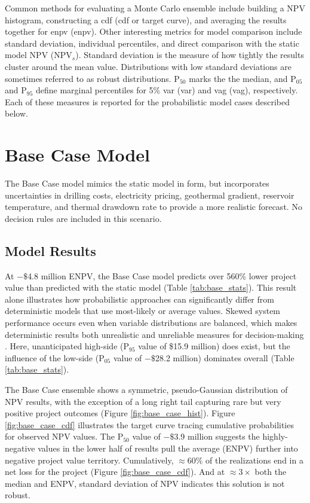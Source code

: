 Common methods for evaluating a Monte Carlo ensemble include building a NPV histogram, constructing a \acrlong{cdf} (\acrshort{cdf} or target curve), and averaging the results together for \acrlong{enpv} (\acrshort{enpv}). Other interesting metrics for model comparison include standard deviation, individual percentiles, and direct comparison with the static model NPV (NPV$_{s}$). Standard deviation is the measure of how tightly the results cluster around the mean value. Distributions with low standard deviations are sometimes referred to as robust distributions. P$_{50}$ marks the the median, and P$_{05}$ and P$_{95}$ define marginal percentiles for 5\% \acrlong{var} (\acrshort{var}) and \acrlong{vag} (\acrshort{vag}), respectively. Each of these measures is reported for the probabilistic model cases described below.

\section{Base Case Model}\label{ch6:base_case}

The Base Case model mimics the static model in form, but incorporates uncertainties in drilling costs, electricity pricing, geothermal gradient, reservoir temperature, and thermal drawdown rate to provide a more realistic forecast. No decision rules are included in this scenario. 

\subsection{Model Results}\label{ch6:base_results}

At $-\$$4.8 million ENPV, the Base Case model predicts over 560\% lower project value than predicted with the static model (Table \ref{tab:base_stats}). This result alone illustrates how probabilistic approaches can significantly differ from deterministic models that use most-likely or average values. Skewed system performance occurs even when variable distributions are balanced, which makes deterministic results both unrealistic and unreliable measures for decision-making \citep[p.\ 48--49]{de_neufville_flexibility_2011}. Here, unanticipated high-side (P$_{95}$ value of \$15.9 million) does exist, but the influence of the low-side (P$_{05}$ value of $-\$$28.2 million) dominates overall (Table \ref{tab:base_stats}).

The Base Case ensemble shows a symmetric, pseudo-Gaussian distribution of NPV results, with the exception of a long right tail capturing rare but very positive project outcomes (Figure \ref{fig:base_case_hist}). Figure \ref{fig:base_case_cdf} illustrates the target curve tracing cumulative probabilities for observed NPV values. The P$_{50}$ value of $-\$$3.9 million suggests the highly-negative values in the lower half of results pull the average (ENPV) further into negative project value territory. Cumulatively, $\approx60\%$ of the realizations end in a net loss for the project (Figure \ref{fig:base_case_cdf}). And at $\approx3\times$ both the median and ENPV, standard deviation of NPV indicates this solution is not robust. 

